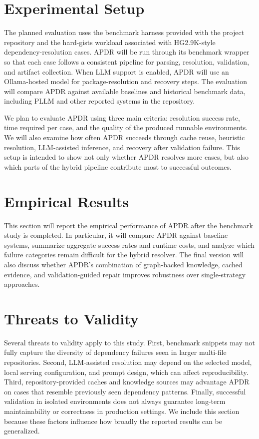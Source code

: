 \documentclass[conference]{IEEEtran}
\begin{document}
\section{Experimental Setup}
The planned evaluation uses the benchmark harness provided with the project repository and the hard-gists workload associated with HG2.9K-style dependency-resolution cases. APDR will be run through its benchmark wrapper so that each case follows a consistent pipeline for parsing, resolution, validation, and artifact collection. When LLM support is enabled, APDR will use an Ollama-hosted model for package-resolution and recovery steps. The evaluation will compare APDR against available baselines and historical benchmark data, including PLLM and other reported systems in the repository.

We plan to evaluate APDR using three main criteria: resolution success rate, time required per case, and the quality of the produced runnable environments. We will also examine how often APDR succeeds through cache reuse, heuristic resolution, LLM-assisted inference, and recovery after validation failure. This setup is intended to show not only whether APDR resolves more cases, but also which parts of the hybrid pipeline contribute most to successful outcomes.

\section{Empirical Results}
This section will report the empirical performance of APDR after the benchmark study is completed. In particular, it will compare APDR against baseline systems, summarize aggregate success rates and runtime costs, and analyze which failure categories remain difficult for the hybrid resolver. The final version will also discuss whether APDR's combination of graph-backed knowledge, cached evidence, and validation-guided repair improves robustness over single-strategy approaches.

\section{Threats to Validity}
Several threats to validity apply to this study. First, benchmark snippets may not fully capture the diversity of dependency failures seen in larger multi-file repositories. Second, LLM-assisted resolution may depend on the selected model, local serving configuration, and prompt design, which can affect reproducibility. Third, repository-provided caches and knowledge sources may advantage APDR on cases that resemble previously seen dependency patterns. Finally, successful validation in isolated environments does not always guarantee long-term maintainability or correctness in production settings. We include this section because these factors influence how broadly the reported results can be generalized.
\end{document}
